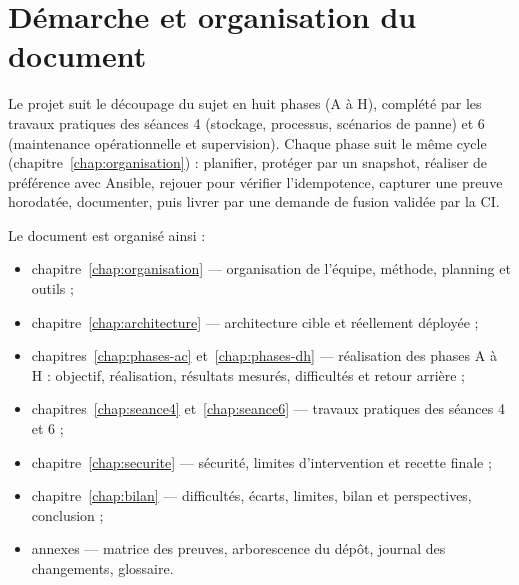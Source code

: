 \section{Démarche et organisation du document}

Le projet suit le découpage du sujet en huit phases (A à H), complété par les travaux pratiques des
séances 4 (stockage, processus, scénarios de panne) et 6 (maintenance opérationnelle et
supervision). Chaque phase suit le même cycle (chapitre~\ref{chap:organisation}) : planifier,
protéger par un snapshot, réaliser de préférence avec Ansible, rejouer pour vérifier l'idempotence,
capturer une preuve horodatée, documenter, puis livrer par une demande de fusion validée par la CI.

Le document est organisé ainsi :
\begin{itemize}
  \item chapitre~\ref{chap:organisation} — organisation de l'équipe, méthode, planning et outils ;
  \item chapitre~\ref{chap:architecture} — architecture cible et réellement déployée ;
  \item chapitres~\ref{chap:phases-ac} et~\ref{chap:phases-dh} — réalisation des phases A à H : objectif,
        réalisation, résultats mesurés, difficultés et retour arrière ;
  \item chapitres~\ref{chap:seance4} et~\ref{chap:seance6} — travaux pratiques des séances 4 et 6 ;
  \item chapitre~\ref{chap:securite} — sécurité, limites d'intervention et recette finale ;
  \item chapitre~\ref{chap:bilan} — difficultés, écarts, limites, bilan et perspectives, conclusion ;
  \item annexes — matrice des preuves, arborescence du dépôt, journal des changements, glossaire.
\end{itemize}

